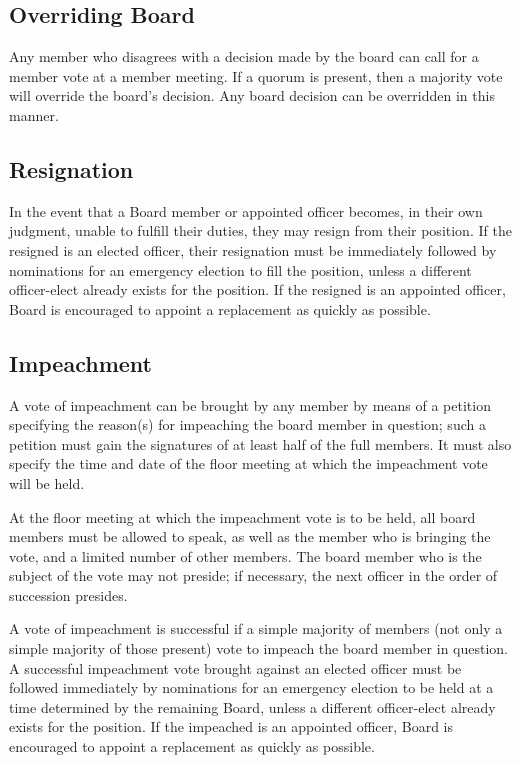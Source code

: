 \subsection{Overriding Board}

Any member who disagrees with a decision made by the board can call for a member vote at a member meeting. If a quorum is present, then a majority vote will override the board's decision. Any board decision can be overridden in this manner.



	\subsection {Resignation}

In the event that a Board member or appointed officer becomes, in their own judgment, unable to fulfill their duties, they may resign from their position. If the resigned is an elected officer, their resignation must be immediately followed by nominations for an emergency election to fill the position, unless a different officer-elect already exists for the position. If the resigned is an appointed officer, Board is encouraged to appoint a replacement as quickly as possible.



	\subsection {Impeachment}

A vote of impeachment can be brought by any member by means of a petition specifying the reason(s) for impeaching the board member in question; such a petition must gain the signatures of at least half of the full members. It must also specify the time and date of the floor meeting at which the impeachment vote will be held.

At the floor meeting at which the impeachment vote is to be held, all board members must be allowed to speak, as well as the member who is bringing the vote, and a limited number of other members. The board member who is the subject of the vote may not preside; if necessary, the next officer in the order of succession presides. 

A vote of impeachment is successful if a simple majority of members (not only a simple majority of those present) vote to impeach the board member in question. A successful impeachment vote brought against an elected officer must be followed immediately by nominations for an emergency election to be held at a time determined by the remaining Board, unless a different officer-elect already exists for the position. If the impeached is an appointed officer, Board is encouraged to appoint a replacement as quickly as possible.




